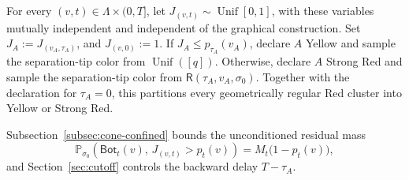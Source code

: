 \documentclass[letterpaper,11pt,reqno]{amsart}
\theoremstyle{definition}
\begin{document}
For every \((v,t)\in\Lambda\times(0,T]\), let
\(J_{(v,t)}\sim\operatorname{Unif}[0,1]\), with these variables mutually
independent and independent of the graphical construction. Set
\(J_A:=J_{(v_A,\tau_A)}\), and $J_{(v,0)}:=1$. If
\(J_A\le p_{\tau_A}(v_A)\), declare \(A\) Yellow and sample the
separation-tip color from \(\operatorname{Unif}([q])\). Otherwise, declare
\(A\) Strong Red and sample the separation-tip color from
\(\mathsf R(\tau_A,v_A,\sigma_0)\). Together with the declaration for
\(\tau_A=0\), this partitions every geometrically regular Red cluster into
Yellow or Strong Red.

Subsection~\ref{subsec:cone-confined} bounds the unconditioned residual mass
\[
\mathbb P_{\sigma_0}\left(
\mathsf{Bot}_t(v),\,
J_{(v,t)}>p_t(v)
\right)
=M_t\bigl(1-p_t(v)\bigr),
\]
and Section~\ref{sec:cutoff} controls the backward delay \(T-\tau_A\).
\end{document}
